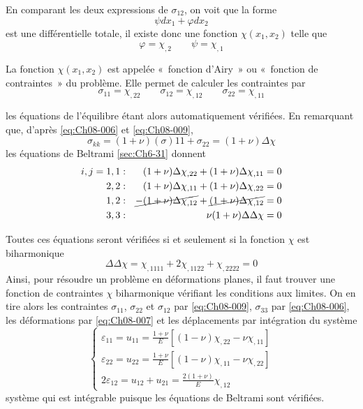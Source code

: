 En comparant les deux expressions de $\sigma_{12}$, on voit que la forme 
\begin{equation*}
\psi dx_1 + \varphi dx_2
\end{equation*}
est une différentielle totale, il existe donc une fonction $\chi(x_1,x_2)$ telle que 
\begin{equation*}
\varphi=\chi_{,2} \qquad \psi=\chi_{,1}
\end{equation*}

La fonction $\chi(x_1,x_2)$ est appelée «~fonction d'Airy~» ou «~fonction de contraintes~» du problème. 
Elle permet de calculer les contraintes par 
\begin{equation}
\sigma_{11}=\chi_{,22} \qquad \sigma_{12}=\chi_{,12} \qquad \sigma_{22}=\chi_{,11}
    \label{eq:Ch08-009}
\end{equation}

les équations de l'équilibre étant alors automatiquement vérifiées. 
En remarquant que, d'après \eqref{eq:Ch08-006} et \eqref{eq:Ch08-009}, 
\begin{equation}
\sigma_{kk}=(1+\nu)(\sigma){11}+\sigma_{22}=(1+\nu)\Delta\chi
\label{eq:Ch08-010}
\end{equation}
les équations de Beltrami \ref{sec:Ch6-31} donnent 
\begin{equation}
  \begin{aligned}
  i,j = 1,1 & : &  (1+\nu) \Delta\chi_{,22} + (1+\nu) \Delta\chi_{,11}=0 \\
        2,2 & : &  (1+\nu) \Delta\chi_{,11} + (1+\nu) \Delta\chi_{,22}=0 \\ 
        1,2 & : & \cancel{-(1+\nu) \Delta\chi_{,12}} + \cancel{(1+\nu) \Delta\chi_{,12}}=0 \\
        3,3 & : & \nu(1+\nu) \Delta\Delta\chi = 0 \\
  \end{aligned}
\label{eq:Ch08-011}
\end{equation}

Toutes ces équations seront vérifiées si et seulement si la fonction $\chi$ est biharmonique 
\begin{equation}
\Delta\Delta\chi=\chi_{,1111}+2\chi_{,1122}+\chi_{,2222}=0
\label{eq:Ch08-012}
\end{equation}
Ainsi, pour résoudre un problème en déformations planes, il faut trouver une fonction de contraintes $\chi$ biharmonique vérifiant les conditions aux limites. 
On en tire alors les contraintes $\sigma_{11}$, $\sigma_{22}$ et $\sigma_{12}$ par \eqref{eq:Ch08-009}, $\sigma_{33}$ par \eqref{eq:Ch08-006}, les déformations par \eqref{eq:Ch08-007} et les déplacements par intégration du système 
\begin{equation}
  \begin{cases}
  \varepsilon_{11}=u_{11}=\frac{1+\nu}{E}[(1-\nu)\chi_{,22}-\nu\chi_{,11}] \\
  \varepsilon_{22}=u_{22}=\frac{1+\nu}{E}[(1-\nu)\chi_{,11}-\nu\chi_{,22}] \\
  2\varepsilon_{12}=u_{12}+u_{21}=\frac{2(1+\nu)}{E}\chi_{,12}
  \end{cases}
\label{eq:Ch08-013}
\end{equation}
système qui est intégrable puisque les équations de Beltrami sont vérifiées. 
